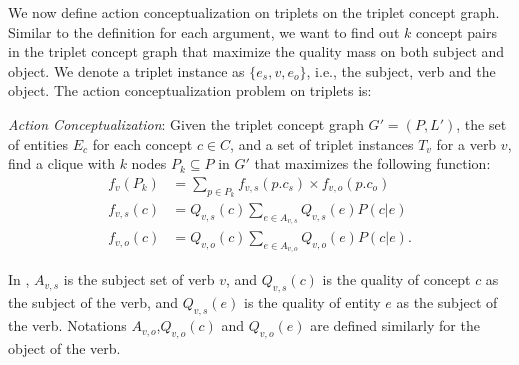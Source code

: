 We now define action conceptualization on triplets on the triplet concept 
graph. Similar to the definition for each argument, we want to find out 
$k$ concept pairs in the triplet concept graph that maximize the quality 
mass on both subject and object.
We denote a triplet instance as $\{e_s, v,  e_o\}$, i.e., the subject, verb and 
the object.
The action conceptualization problem on triplets is:
\begin{definition}
\emph{Action Conceptualization}: 
Given the triplet concept graph $G'=(P,L')$, 
the set of entities $E_c$ for each concept $c\in C$,
and a set of triplet instances $T_v$ for a verb $v$, find a clique
with $k$ nodes $P_k\subseteq P$
in $G'$ that maximizes the following function:
\begin{equation}
\begin{split}
f_v(P_k)&=\sum_{p\in P_k}{f_{v,s}(p.c_s)\times f_{v,o}(p.c_o)}\\
f_{v,s}(c)&=Q_{v,s}(c)\sum_{e\in A_{v,s}}{Q_{v,s}(e)P(c|e)} \\
f_{v,o}(c)&=Q_{v,o}(c)\sum_{e\in A_{v,o}}{Q_{v,o}(e)P(c|e)}.
\end{split}
\label{eq:objectivetri}
\end{equation}
\end{definition}
In , $A_{v,s}$ is the subject set of verb $v$, and $Q_{v,s}(c)$ is
the quality of concept $c$ as the subject of the verb, and $Q_{v,s}(e)$ is
the quality of entity $e$ as the subject of the verb. Notations 
$A_{v,o}$,$Q_{v,o}(c)$ and $Q_{v,o}(e)$ are defined similarly for the 
object of the verb.

